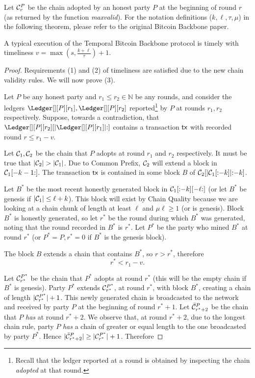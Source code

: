 Let $\mathcal{C}^P_r$ be the chain adopted by an honest party $P$ at the
beginning of round $r$ (as returned by the function \emph{maxvalid}).
For the notation definitions ($k, \ell, \tau, \mu$)
in the following theorem, please refer to the original Bitcoin
Backbone paper.

\begin{theorem}
  A typical execution of the Temporal Bitcoin Backbone protocol is timely
  with timeliness $v = \max(s, \frac{k + \ell}{\tau}) + 1$.
\end{theorem}
\begin{proof}
  Requirements (1) and (2) of timeliness are satisfied due to the new chain validity rules.
  We will now prove (3).

  Let $P$ be any honest party and $r_1 \leq r_2 \in \mathbb{N}$ be any rounds, and consider
  the ledgers $\Ledger[][P][r_1], \Ledger[][P][r_2]$ reported\footnote{
    Recall that the ledger reported at a round is obtained by inspecting the
    chain \emph{adopted} at that round.
  } by $P$ at rounds $r_1, r_2$ respectively.
  Suppose, towards a contradiction, that $\Ledger[][P][r_2][|\Ledger[][P][r_1]|{:}]$ contains a transaction
  $\textsf{tx}$ with recorded round $r \leq r_1 - v$.

  Let $\mathcal{C}_1, \mathcal{C}_2$ be the chain that $P$ adopts at round $r_1$
  and $r_2$ respectively.
  It must be true that $|\mathcal{C}_2| > |\mathcal{C}_1|$.
  Due to Common Prefix, $\mathcal{C}_2$ will extend a block in $\mathcal{C}_1[-k-1{:}]$.
  The transaction $\textsf{tx}$ is contained in some block $B$ of $\mathcal{C}_2[|\mathcal{C}_1[{:}{-k}]|{:}{-k}]$.

  Let $B^*$ be the most recent
  honestly generated block in $\mathcal{C}_1[{:}{-k}][{-\ell}{:}]$
  (or let $B^*$ be genesis if $|\mathcal{C}_1| \leq \ell + k$).
  This block will exist by
  Chain Quality because we are looking at a chain chunk of length at least $\ell$ and
  $\mu\ell \geq 1$ (or is genesis).
  Block $B^*$ is honestly generated, so let $r^*$ be the round
  during which $B^*$ was generated, noting that the round recorded in $B^*$ is $r^*$.
  Let $P^*$ be the party who mined $B^*$ at round $r^*$ (or $P^* = P, r^* = 0$ if $B^*$ is
  the genesis block).

  The block $B$ extends a chain that contains $B^*$, so $r > r^*$,
  therefore
  \begin{equation}
    r^* < r_1 - v\label{eq:bitcoin-r-bound}.
  \end{equation}

  Let $\mathcal{C}^{P^*}_{r^*}$ be the chain that $P^*$ adopts at
  round $r^*$ (this will be the empty chain if $B^*$ is genesis).
  Party $P^*$ extends $\mathcal{C}^{P^*}_{r^*}$, at round $r^*$, with block $B^*$,
  creating a chain of length $|\mathcal{C}^{P^*}_{r^*}| + 1$.
  This newly generated chain is broadcasted to the network and
  received by party $P$ at the beginning of round $r^* + 1$.
  Let $\bar {\mathcal{C}}^P_{r^* + 2}$ be the chain
  that $P$ \emph{has} at round $r^* + 2$.
  We observe that, at round $r^* + 2$, due to the
  longest chain rule, party $P$ \emph{has} a chain of greater or equal
  length to the one broadcasted by party $P^*$. Hence
  $|\bar {\mathcal{C}}^P_{r^* + 2}| \geq |\mathcal{C}^{P^*}_{r^*}| + 1$. Therefore


\end{proof}
